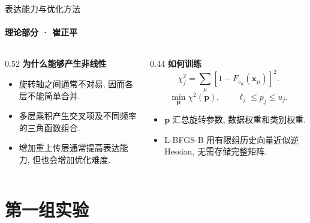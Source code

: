 \documentclass{ctexbeamer}
\begin{document}
\begin{frame}{表达能力与优化方法}
    \framesubtitle{理论部分 · 崔正平}
    \begin{columns}[T]
        \begin{column}{0.52\textwidth}
            \textbf{为什么能够产生非线性}
            \begin{itemize}
                \setlength{\itemsep}{0.9ex}
                \item 旋转轴之间通常不对易, 因而各层不能简单合并.
                \item 多层乘积产生交叉项及不同频率的三角函数组合.
                \item 增加重上传层通常提高表达能力, 但也会增加优化难度.
            \end{itemize}
        \end{column}
        \begin{column}{0.44\textwidth}
            \textbf{如何训练}
            \[
                \chi_f^2
                =\sum_\mu\left[1-F_{s_\mu}(\bm{x}_\mu)\right]^2.
            \]
            \[
                \min_{\bm{p}}\chi^2(\bm{p}),
                \qquad \ell_j\leq p_j\leq u_j.
            \]
            \begin{itemize}
                \setlength{\itemsep}{0.8ex}
                \item $\bm{p}$ 汇总旋转参数, 数据权重和类别权重.
                \item L-BFGS-B 用有限组历史向量近似逆 Hessian, 无需存储完整矩阵.
            \end{itemize}
        \end{column}
    \end{columns}
\end{frame}

\section{第一组实验}
\end{document}
